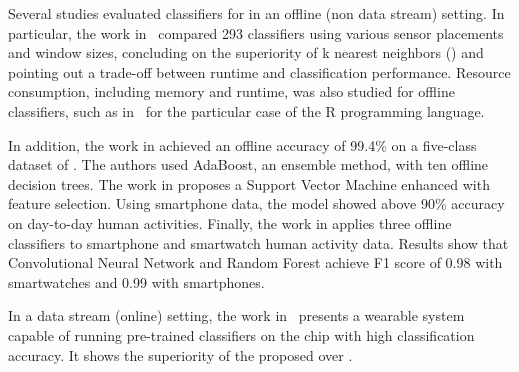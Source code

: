 Several studies evaluated classifiers for \har in an offline (non data stream)
setting. In particular, the work in~\cite{Janidarmian_2017} compared 293
classifiers using various sensor placements and window sizes, concluding on the
superiority of k nearest neighbors (\knn) and pointing out a trade-off between
runtime and classification performance. Resource consumption, including memory
and runtime, was also studied for offline classifiers, such as
in~\cite{memory_consumption_machine_learning} for the particular case of the R
programming language.

In addition, the work in \cite{ugulino2012} achieved an offline accuracy of
99.4\% on a five-class dataset of \har. The authors used AdaBoost, an ensemble
method, with ten offline decision trees. The work in \cite{ahmed2019smartphone}
proposes a Support Vector Machine enhanced with feature selection. Using
smartphone data, the model showed above 90\% accuracy on day-to-day human
activities. Finally, the work in \cite{san2018robust} applies three offline
classifiers to smartphone and smartwatch human activity data. Results show that
Convolutional Neural Network and Random Forest achieve F1 score of 0.98 with
smartwatches and 0.99 with smartphones.

In a data stream (online) setting, the work in~\cite{omid_2019} presents a
wearable system capable of running pre-trained classifiers on the chip with high
classification accuracy. It shows the superiority of the proposed \FNN over
\knn.

